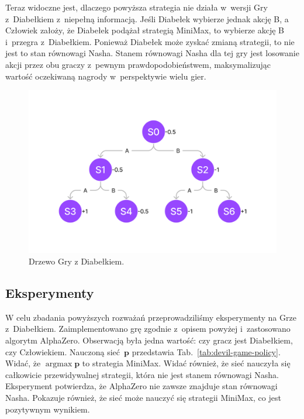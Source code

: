 Teraz widoczne jest, dlaczego powyższa strategia nie działa
w~wersji Gry z~Diabełkiem z~niepełną informacją.
Jeśli Diabełek wybierze jednak akcję B, a Człowiek założy, że Diabełek
podążał strategią MiniMax, to wybierze akcję B i~przegra z~Diabełkiem.
Ponieważ Diabełek może zyskać zmianą strategii, to nie jest to stan równowagi Nasha.
Stanem równowagi Nasha dla tej gry jest losowanie akcji przez obu
graczy z~pewnym prawdopodobieństwem, maksymalizując wartość
oczekiwaną nagrody w~perspektywie wielu gier.

\begin{figure}[h!]
    \centering
    \includegraphics[width=\textwidth]{img/ai/devil-game-tree.png}
    \caption{Drzewo Gry z Diabełkiem.}
    \label{fig:devil-game-tree}
\end{figure}

\FloatBarrier

\subsection*{Eksperymenty}

W celu zbadania powyższych rozważań przeprowadziliśmy eksperymenty
na Grze z~Diabełkiem.
Zaimplementowano grę zgodnie z~opisem powyżej
i~zastosowano algorytm AlphaZero.
Obserwacją była jedna wartość: czy gracz jest Diabełkiem, czy Człowiekiem.
Nauczoną sieć~$\mathbf{p}$ przedstawia Tab.~\ref{tab:devil-game-policy}.
Widać, że $\operatorname{argmax} \mathbf{p}$ to strategia MiniMax.
Widać również, że sieć nauczyła się całkowicie przewidywalnej strategii,
która nie jest stanem równowagi Nasha.
Eksperyment potwierdza, że AlphaZero nie zawsze znajduje stan równowagi Nasha.
Pokazuje również, że sieć może nauczyć się strategii MiniMax,
co jest pozytywnym wynikiem.

